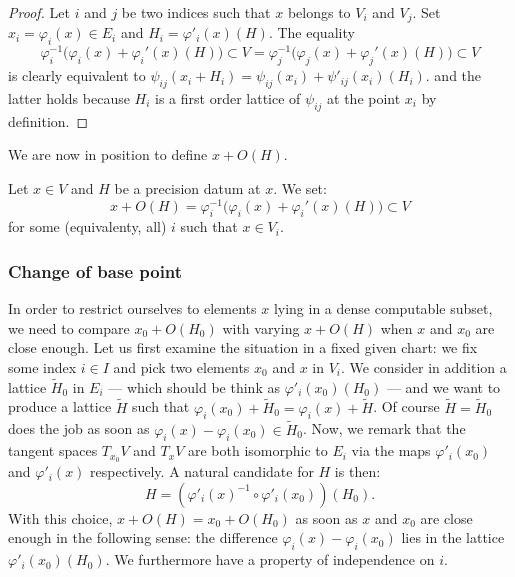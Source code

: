 \documentclass{lms}
\begin{document}
\begin{proof}
Let $i$ and $j$ be two indices such that $x$ belongs to $V_i$ and $V_j$. 
Set $x_i = \varphi_i(x) \in E_i$ and $H_i = \varphi'_i(x)(H)$. The 
equality 
$$\varphi_i^{-1}\big(\varphi_i(x) + \varphi_i'(x)(H)\big) 
\subset V = \varphi_j^{-1}\big(\varphi_j(x) + \varphi_j'(x)(H)\big) 
\subset V$$
is clearly equivalent to
$\psi_{ij}(x_i + H_i) = \psi_{ij}(x_i) + \psi'_{ij}(x_i)(H_i)$.
and the latter holds because $H_i$ is a first order lattice
of $\psi_{ij}$ at the point $x_i$ by definition.
\end{proof}

We are now in position to define $x + O(H)$.

\begin{deftn}
Let $x \in V$ and $H$ be a precision datum at $x$. We set:
$$x + O(H) = \varphi_i^{-1}\big(\varphi_i(x) + \varphi_i'(x)(H)\big)
\subset V$$
for some (equivalenty, all) $i$ such that $x \in V_i$.
\end{deftn}

\subsubsection*{Change of base point}

In order to restrict ourselves to elements $x$ lying in a dense 
computable subset, we need to compare $x_0 + O(H_0)$ with varying $x + 
O(H)$ when $x$ and $x_0$ are close enough. Let us first examine the 
situation in a fixed given chart: we fix some index $i \in I$ and pick 
two elements $x_0$ and $x$ in $V_i$. We consider in addition a lattice 
$\tilde H_0$ in $E_i$ --- which should be think as $\varphi'_i(x_0) 
(H_0)$ --- and we want to produce a lattice $\tilde H$ such that 
$\varphi_i(x_0) + \tilde H_0 = \varphi_i(x) + \tilde H$. Of course 
$\tilde H = \tilde H_0$ does the job as soon as 
$\varphi_i(x) - \varphi_i(x_0) \in \tilde H_0$. 
Now, we remark that the tangent spaces $T_{x_0} V$ and $T_x V$ are both 
isomorphic to $E_i$ via the maps $\varphi'_i(x_0)$ and $\varphi'_i(x)$ 
respectively. A natural candidate for $H$ is then:
\begin{equation}
\label{eq:Hprime}
H = \left(\varphi'_i(x)^{-1} \circ \varphi'_i(x_0)\right) (H_0).
\end{equation}
With this choice, $x + O(H) = x_0 + O(H_0)$ as soon as $x$ and $x_0$ are 
close enough in the following sense: the difference $\varphi_i(x) - 
\varphi_i(x_0)$ lies in the lattice $\varphi'_i(x_0)(H_0)$. We 
furthermore have a property of independence on $i$.
\end{document}

